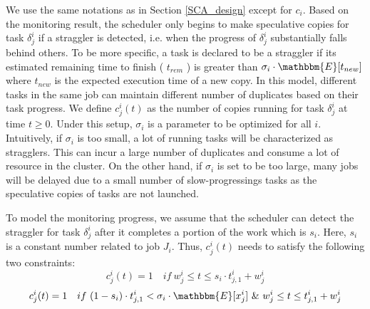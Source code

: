 \documentclass[10pt,conference]{IEEEtran}
\begin{document}
We use the same notations as in Section \ref{SCA_design} except for $c_i$.  Based on the monitoring result, the scheduler only begins to make speculative copies for task $\delta^i_j$ if a straggler is detected, i.e.  when the progress of $\delta^i_j$ substantially falls behind others. To be more specific,
a task is declared to be a straggler if its estimated remaining time to finish ( $t_{rem}$ ) is
greater than $\sigma_i \cdot \mathbbm{E} [t_{new}]$ where $t_{new}$ is the expected execution time of a new copy. In this model, different tasks in the same job can maintain different number of duplicates based on their task progress. We define $c^i_j(t)$ as the number of copies running for task $\delta^i_j$ at time $t \geq 0$.
Under this setup,  $\sigma_i$ is a parameter to be optimized for all $i$. Intuitively, if $\sigma_i$ is too small, a lot of running tasks will be characterized as stragglers. This can incur a large number of duplicates and consume a lot of resource in the cluster. On the other hand, if $\sigma_i$ is set to be too large, many jobs will be delayed due to a small number of  slow-progressings tasks  as the speculative copies of tasks are not launched.


To model the monitoring progress, we assume that the scheduler can detect the straggler for task $\delta^i_j$ after it completes a portion of the work which is $s_i$. Here, $s_i$ is a constant number related to job $J_i$. Thus, $c^i_j(t)$ needs to satisfy the following two constraints:
 \begin{equation}
 \label{p2_1}
c^i_j(t) = 1 \quad if \  w^i_j \leq t \leq  s_i \cdot t^i_{j,1} + w^i_j
\end{equation}
\begin{equation}
 \label{p2_2}
c^i_j(t) = 1 \quad if \ (1 - s_i) \cdot t^i_{j,1} < \sigma_i \cdot \mathbbm{E}[x^i_j] \  \& \ w^i_j \leq t \leq  t^i_{j,1} + w^i_j
\end{equation}
\end{document}
